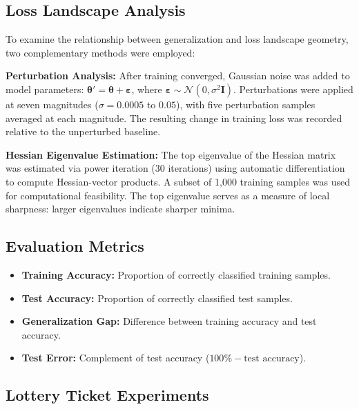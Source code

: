 \documentclass[conference]{IEEEtran}
\begin{document}
\subsection{Loss Landscape Analysis}

To examine the relationship between generalization and loss landscape geometry, two complementary methods were employed:

\textbf{Perturbation Analysis:} After training converged, Gaussian noise was added to model parameters: $\boldsymbol{\theta}' = \boldsymbol{\theta} + \boldsymbol{\varepsilon}$, where $\boldsymbol{\varepsilon} \sim \mathcal{N}(0, \sigma^2 \mathbf{I})$. Perturbations were applied at seven magnitudes ($\sigma = 0.0005$ to $0.05$), with five perturbation samples averaged at each magnitude. The resulting change in training loss was recorded relative to the unperturbed baseline.

\textbf{Hessian Eigenvalue Estimation:} The top eigenvalue of the Hessian matrix was estimated via power iteration (30 iterations) using automatic differentiation to compute Hessian-vector products. A subset of 1,000 training samples was used for computational feasibility. The top eigenvalue serves as a measure of local sharpness: larger eigenvalues indicate sharper minima.

\subsection{Evaluation Metrics}

\begin{itemize}
    \item \textbf{Training Accuracy:} Proportion of correctly classified training samples.
    \item \textbf{Test Accuracy:} Proportion of correctly classified test samples.
    \item \textbf{Generalization Gap:} Difference between training accuracy and test accuracy.
    \item \textbf{Test Error:} Complement of test accuracy ($100\% - \text{test accuracy}$).
\end{itemize}

\subsection{Lottery Ticket Experiments}
\end{document}
